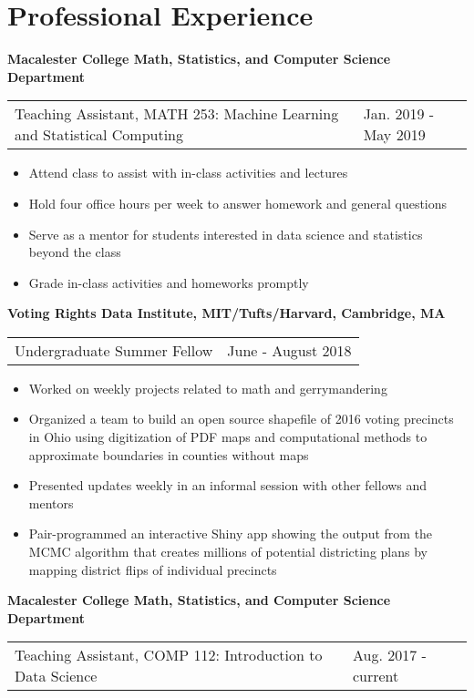 \section{\sc Professional Experience}
{\bf{Macalester College Math, Statistics, and Computer Science Department}}\\
\begin{tabular}{@{}p{4in}p{2in}}
Teaching Assistant, MATH 253: Machine Learning and Statistical Computing& Jan. 2019 - May 2019\\
\end{tabular}
\begin{itemize}
\setlength\itemsep{0em}
\item Attend class to assist with in-class activities and lectures 
\item Hold four office hours per week to answer homework and general questions
\item Serve as a mentor for students interested in data science and statistics beyond the class
\item Grade in-class activities and homeworks promptly
\end{itemize}
{\bf{Voting Rights Data Institute, MIT/Tufts/Harvard, Cambridge, MA}}\\
\begin{tabular}{@{}p{4in}p{2in}}
Undergraduate Summer Fellow & June - August 2018\\
\end{tabular}
\begin{itemize}
\setlength\itemsep{0em}
\item Worked on weekly projects related to math and gerrymandering 
\item Organized a team to build an open source shapefile of 2016 voting precincts in Ohio using digitization of PDF maps and computational methods to approximate boundaries in counties without maps
\item Presented updates weekly in an informal session with other fellows and mentors
\item Pair-programmed an interactive Shiny app showing the output from the MCMC algorithm that creates millions of potential districting plans by mapping district flips of individual precincts
\end{itemize}
{\bf{Macalester College Math, Statistics, and Computer Science Department}}\\
\begin{tabular}{@{}p{4in}p{2in}}
Teaching Assistant, COMP 112: Introduction to Data Science & Aug. 2017 - current\\
\end{tabular}
